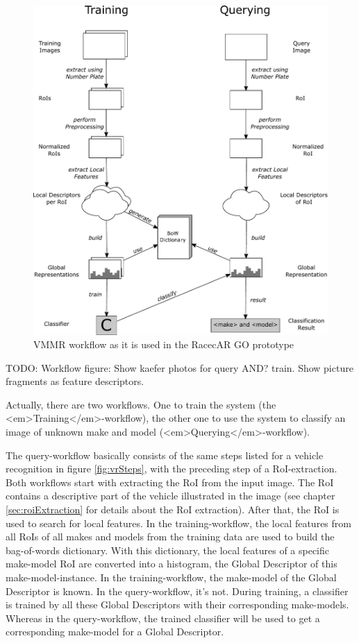 \begin{figure}[bth]
  \centering
        \includegraphics[width=.75\linewidth]{gfx/vmmr_workflow}
        \caption{VMMR workflow as it is used in the RacecAR GO prototype}
        \label{fig:vmmrWorkflow}
\end{figure}
TODO: Workflow figure: Show kaefer photos for query AND? train. Show picture fragments as feature descriptors.

Actually, there are two workflows. One to train the system (the <em>Training</em>-workflow), the other one to use the system to classify an image of unknown make and model (<em>Querying</em>-workflow).

The query-workflow basically consists of the same steps listed for a vehicle recognition in figure \ref{fig:vrSteps}, with the preceding step of a RoI-extraction. Both workflows start with extracting the RoI from the input image. The RoI contains a descriptive part of the vehicle illustrated in the image (see chapter \ref{sec:roiExtraction} for details about the RoI extraction). After that, the RoI is used to search for local features. In the training-workflow, the local features from all RoIs of all makes and models from the training data are used to build the bag-of-words dictionary. With this dictionary, the local features of a specific make-model RoI are converted into a histogram, the Global Descriptor of this make-model-instance. In the training-workflow, the make-model of the Global Descriptor is known. In the query-workflow, it's not.
During training, a classifier is trained by all these Global Descriptors with their corresponding make-models. Whereas in the query-workflow, the trained classifier will be used to get a corresponding make-model for a Global Descriptor.

